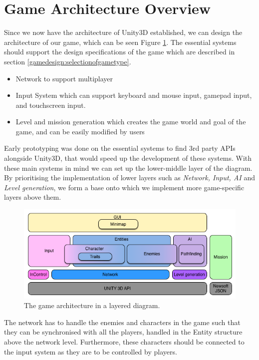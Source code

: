 \section{Game Architecture Overview}
Since we now have the architecture of Unity3D established, we can design the architecture of our game, which can be seen Figure \ref{fig:architecture:diagram}.
The essential systems should support the design specifications of the game which are described in section \ref{gamedesign:selectionofgametype}.
\begin{itemize}
    \item Network to support multiplayer
    \item Input System which can support keyboard and mouse input, gamepad input, and touchscreen input.
    \item Level and mission generation which creates the game world and goal of the game, and can be easily modified by users
\end{itemize}
Early prototyping was done on the essential systems to find 3rd party APIs alongside Unity3D, that would speed up the development of these systems.
With these main systems in mind we can set up the lower-middle layer of the diagram.
By prioritising the implementation of lower layers such as \textit{Network, Input, AI} and \textit{Level generation}, we form a base onto which we implement more game-specific layers above them.

\begin{figure}
	\includegraphics[width = \textwidth]{figures/architecture/game_architecture_overview.png}
	\caption{The game architecture in a layered diagram.}
	\label{fig:architecture:diagram}
\end{figure}

The network has to handle the enemies and characters in the game such that they can be synchronised with all the players, handled in the Entity structure above the network level.
Furthermore, these characters should be connected to the input system as they are to be controlled by players.

